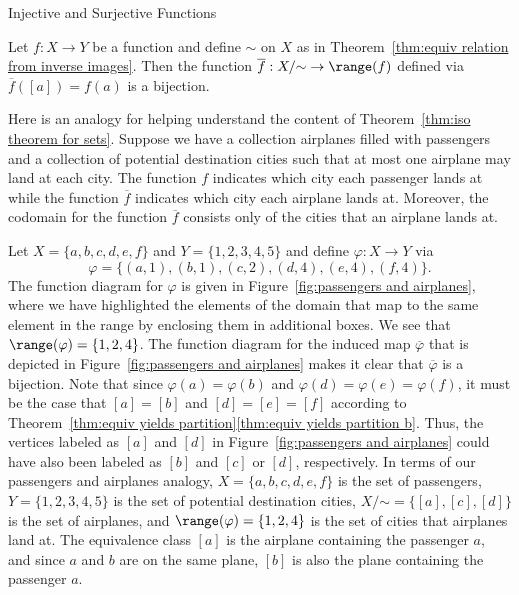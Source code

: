 \begin{section}{Injective and Surjective Functions}
\begin{theorem}\label{thm:iso theorem for sets}
Let $f:X\to Y$ be a function and define $\sim$ on $X$ as in Theorem~\ref{thm:equiv relation from inverse images}. 
Then the function $\overline{f}:X/\mathord\sim\to \range(f)$ defined via $\overline{f}([a]) = f(a)$ is a bijection.
\end{theorem}

Here is an analogy for helping understand the content of Theorem~\ref{thm:iso theorem for sets}.  Suppose we have a collection airplanes filled with passengers and a collection of potential destination cities such that at most one airplane may land at each city.  The function $f$ indicates which city each passenger lands at while the function $\overline{f}$ indicates which city each airplane lands at.  Moreover, the codomain for the function $\overline{f}$ consists only of the cities that an airplane lands at.

\begin{example}
Let $X=\{a,b,c,d,e,f\}$ and $Y=\{1,2,3,4,5\}$ and define $\varphi:X\to Y$ via
\[
\varphi=\{(a,1),(b,1),(c,2),(d,4),(e,4),(f,4)\}.
\]
The function diagram for $\varphi$ is given in Figure~\ref{fig:passengers and airplanes}, where we have highlighted the elements of the domain that map to the same element in the range by enclosing them in additional boxes.  We see that $\range(\varphi)=\{1,2,4\}$. The function diagram for the induced map $\overline{\varphi}$ that is depicted in Figure~\ref{fig:passengers and airplanes} makes it clear that $\overline{\varphi}$ is a bijection.  Note that since $\varphi(a)=\varphi(b)$ and $\varphi(d)=\varphi(e)=\varphi(f)$, it must be the case that $[a]=[b]$ and $[d]=[e]=[f]$ according to Theorem~\ref{thm:equiv yields partition}\ref{thm:equiv yields partition b}.  Thus, the vertices labeled as $[a]$ and $[d]$ in Figure~\ref{fig:passengers and airplanes} could have also been labeled as $[b]$ and $[c]$ or $[d]$, respectively.  In terms of our passengers and airplanes analogy, $X=\{a,b,c,d,e,f\}$ is the set of passengers, $Y=\{1,2,3,4,5\}$ is the set of potential destination cities, $X/\mathord\sim=\{[a],[c],[d]\}$ is the set of airplanes, and $\range(\varphi)=\{1,2,4\}$ is the set of cities that airplanes land at.  The equivalence class $[a]$ is the airplane containing the passenger $a$, and since $a$ and $b$ are on the same plane, $[b]$ is also the plane containing the passenger $a$.
\end{example}


\end{section}
